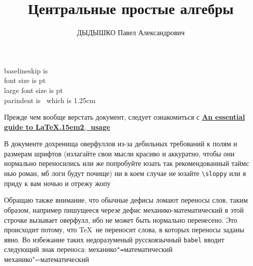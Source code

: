\documentclass{mpaper}
\title{Центральные простые алгебры}
\author{ДЫДЫШКО Павел Александрович}
\renewcommand{\LaTeXe}{\LaTeX\kern.15em2$_{\textstyle\varepsilon}$}
\begin{document}
    \maketitle
    \setcounter{tocdepth}{3}
    \setcounter{page}{2}
    \tableofcontents

    \newpage
    \noindent baselineskip is \the\baselineskip\\
    font size is \makeatletter\f@size\makeatother pt\\
    large font size is {\normalsizerrr \makeatletter\f@size\makeatother} pt\\
    parindent is \the\parindent\ which is 1.25cm

    Прежде чем вообще верстать документ, следует ознакомиться с \href{http://anorien.csc.warwick.ac.uk/mirrors/CTAN/info/l2tabu/english/l2tabuen.pdf}{\bfseries An essential guide to \LaTeXe\ usage}

    В документе дохренища оверфуллов из-за дебильных требований к полям и размерам шрифтов (излагайте свои мысли красиво и аккуратно, чтобы они нормально переносились или же попробуйте юзать так рекомендованный таймс нью роман, мб логи будут почище) ни в коем случае не юзайте \verb|\sloppy| или я приду к вам ночью и отрежу жопу

    Обращаю также внимание, что обычные дефисы ломают переносы слов, таким образом, например пишущееся черезе дефис механико-математический в этой строчке вызывает оверфулл, ибо не может быть нормально перенесено. Это происходит потому, что \TeX\ не переносит слова, в которых переносы заданы явно. Во избежание таких недоразуменый русскоязычный \verb|babel| вводит следующий знак переноса: механико\verb|"=|математический механико"=математический

%    
    
    
    
    
    
    
\end{document}
